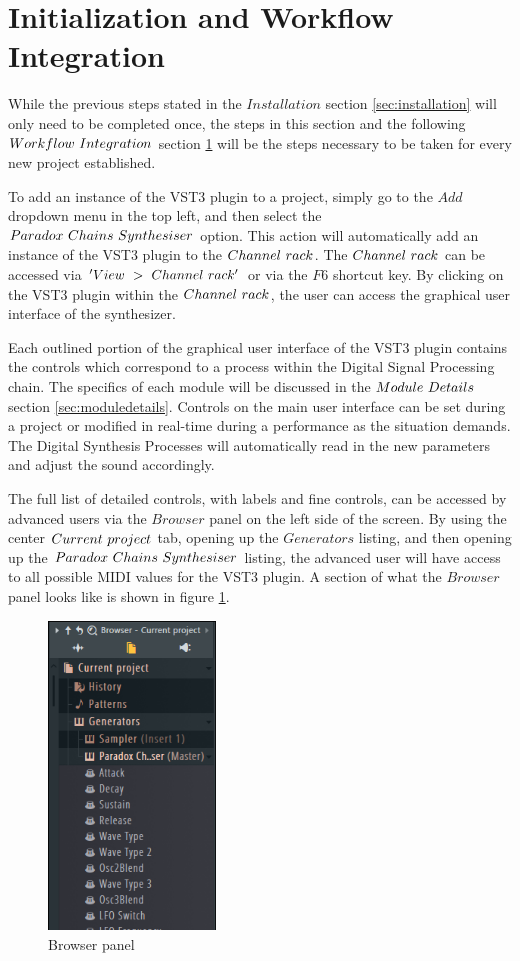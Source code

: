 \documentclass[a4paper,12pt]{report}
\begin{document}
\section{Initialization and Workflow Integration}
\label{sec:initandworkflow}
While the previous steps stated in the $Installation$ section \ref{sec:installation} will only need to be completed once, the steps in this section and the following $Workflow\ \-Integration$ section \ref{sec:initandworkflow} will be the steps necessary to be taken for every new project established.

To add an instance of the VST3 plugin to a project, simply go to the $Add$ dropdown menu in the top left, and then select the $Paradox\ \-Chains\ \-Synthesiser$ option. This action will automatically add an instance of the VST3 plugin to the $Channel\ \-rack$. The $Channel\ \-rack$ can be accessed via $'View\ \->\ \-Channel\ \-rack'$ or via the $F6$ shortcut key. By clicking on the VST3 plugin within the $Channel\ \-rack$, the user can access the graphical user interface of the synthesizer.

Each outlined portion of the graphical user interface of the VST3 plugin contains the controls which correspond to a process within the Digital Signal Processing chain. The specifics of each module will be discussed in the $Module\ \-Details$ section \ref{sec:moduledetails}. Controls on the main user interface can be set during a project or modified in real-time during a performance as the situation demands. The Digital Synthesis Processes will automatically read in the new parameters and adjust the sound accordingly.

The full list of detailed controls, with labels and fine controls, can be accessed by advanced users via the $Browser$ panel on the left side of the screen. By using the center $Current\ \-project$ tab, opening up the $Generators$ listing, and then opening up the $Paradox\ \-Chains\ \-Synthesiser$ listing, the advanced user will have access to all possible MIDI values for the VST3 plugin. A section of what the $Browser$ panel looks like is shown in figure \ref{fig:browserpanel}.

\begin{figure} \centering
\includegraphics[width=12em]{BrowserPanel2.png}
    \caption{Browser panel}     \label{fig:browserpanel} \end{figure}
\end{document}
